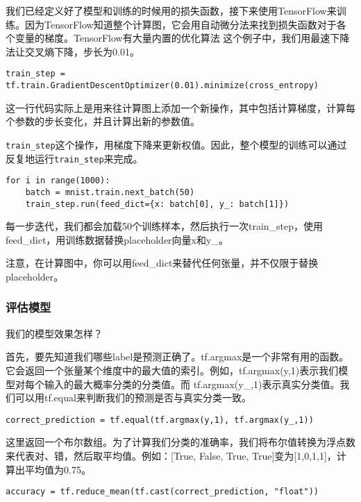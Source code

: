 我们已经定义好了模型和训练的时候用的损失函数，接下来使用TensorFlow来训练。因为TensorFlow知道整个计算图，它会用自动微分法来找到损失函数对于各个变量的梯度。TensorFlow有大量内置的优化算法 这个例子中，我们用最速下降法让交叉熵下降，步长为0.01。

\begin{lstlisting}
train_step = tf.train.GradientDescentOptimizer(0.01).minimize(cross_entropy)
\end{lstlisting}

这一行代码实际上是用来往计算图上添加一个新操作，其中包括计算梯度，计算每个参数的步长变化，并且计算出新的参数值。

\lstinline{train_step}这个操作，用梯度下降来更新权值。因此，整个模型的训练可以通过反复地运行\lstinline{train_step}来完成。

\begin{lstlisting}
for i in range(1000):
    batch = mnist.train.next_batch(50)
    train_step.run(feed_dict={x: batch[0], y_: batch[1]})
\end{lstlisting}

每一步迭代，我们都会加载50个训练样本，然后执行一次train\_step，使用feed\_dict，用训练数据替换placeholder向量x和y\_。

注意，在计算图中，你可以用feed\_dict来替代任何张量，并不仅限于替换placeholder。

\subsubsection{评估模型}

我们的模型效果怎样？

首先，要先知道我们哪些label是预测正确了。tf.argmax是一个非常有用的函数。它会返回一个张量某个维度中的最大值的索引。例如，tf.argmax(y,1)表示我们模型对每个输入的最大概率分类的分类值。而 tf.argmax(y\_,1)表示真实分类值。我们可以用tf.equal来判断我们的预测是否与真实分类一致。

\begin{lstlisting}
correct_prediction = tf.equal(tf.argmax(y,1), tf.argmax(y_,1))
\end{lstlisting}

这里返回一个布尔数组。为了计算我们分类的准确率，我们将布尔值转换为浮点数来代表对、错，然后取平均值。例如：[True, False, True, True]变为[1,0,1,1]，计算出平均值为0.75。

\begin{lstlisting}
accuracy = tf.reduce_mean(tf.cast(correct_prediction, "float"))
\end{lstlisting}

